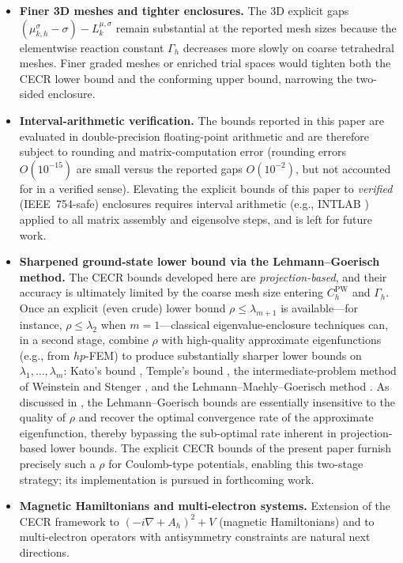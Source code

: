 \documentclass[11pt]{article}
\theoremstyle{plain}
\theoremstyle{definition}
\theoremstyle{remark}
\begin{document}
\begin{itemize}
  \item \textbf{Finer 3D meshes and tighter enclosures.}
    The 3D explicit gaps $(\mu_{k,h}^\sigma{-}\sigma)-L_k^{\mu,\sigma}$ remain
    substantial at the reported mesh sizes because the elementwise
    reaction constant $\Gamma_h$ decreases more slowly on coarse
    tetrahedral meshes. Finer graded meshes or enriched trial
    spaces would tighten both the CECR lower bound and the
    conforming upper bound, narrowing the two-sided enclosure.

  \item \textbf{Interval-arithmetic verification.}
    The bounds reported in this paper are evaluated in
    double-precision floating-point arithmetic and are therefore
    subject to rounding and matrix-computation error (rounding
    errors $O(10^{-15})$ are small versus the reported gaps
    $O(10^{-2})$, but not accounted for in a verified sense).
    Elevating the explicit bounds of this paper to
    \emph{verified} (IEEE~754-safe) enclosures requires interval
    arithmetic (e.g., INTLAB \cite{Rump1999}) applied to all
    matrix assembly and eigensolve steps, and is left for future
    work.

  \item \textbf{Sharpened ground-state lower bound via the
    Lehmann--Goerisch method.}
    The CECR bounds developed here are \emph{projection-based},
    and their accuracy is ultimately limited by the coarse mesh
    size entering $C_h^{\mathrm{PW}}$ and $\Gamma_h$.  Once an
    explicit (even crude) lower bound
    $\rho\le\lambda_{m+1}$ is available---for instance,
    $\rho\le\lambda_2$ when $m=1$---classical
    eigenvalue-enclosure techniques can, in a second stage,
    combine $\rho$ with high-quality approximate eigenfunctions
    (e.g., from $hp$-FEM) to produce substantially sharper lower
    bounds on $\lambda_1,\ldots,\lambda_m$: Kato's bound
    \cite{Kato1949}, Temple's bound \cite{Temple1928}, the
    intermediate-problem method of Weinstein and Stenger
    \cite{WeinsteinStenger1972}, and the Lehmann--Maehly--Goerisch
    method \cite{Lehmann1963,Goerisch1986,BehnkeGoerisch1994}.
    As discussed in \cite[Ch.~5]{liu2024guaranteed}, the
    Lehmann--Goerisch bounds are essentially insensitive to the
    quality of $\rho$ and recover the optimal convergence rate
    of the approximate eigenfunction, thereby bypassing the
    sub-optimal rate inherent in projection-based lower bounds.
    The explicit CECR bounds of the present paper furnish
    precisely such a $\rho$ for Coulomb-type potentials, enabling
    this two-stage strategy; its implementation is pursued in
    forthcoming work.

  \item \textbf{Magnetic Hamiltonians and multi-electron systems.}
    Extension of the CECR framework to $(-i\nabla + A_h)^2 + V$
    (magnetic Hamiltonians) and to multi-electron operators
    with antisymmetry constraints are natural next directions.
\end{itemize}
\end{document}
